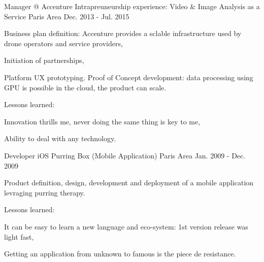 
\begin{cventries}

  \cventry
    {Manager @ Accenture} %
    {Intrapreuneurship experience: Video \& Image Analysis as a Service} %
    {Paris Area} %
    {Dec. 2013 - Jul. 2015} %
    {
      \begin{cvitems} %
        \item {Business plan definition: Accenture provides a sclable infrastructure used by drone operators and service providers,}
        \item {Initiation of partnerships,}
        \item {Platform UX prototyping. Proof of Concept development: data processing using GPU is possible in the cloud, the product can scale.}
        \item {Lessons learned:}
        \begin{cvsubitems}
          \item {Innovation thrills me, never doing the same thing is key to me,}
          \item {Ability to deal with any technology.}
        \end{cvsubitems}
      \end{cvitems}
    }

  \cventry
    {Developer iOS} %
    {Purring Box (Mobile Application)} %
    {Paris Area} %
    {Jan. 2009 - Dec. 2009} %
    {
      \begin{cvitems} %
        \item {Product definition, design, development and deployment of a mobile application levraging purring therapy.}
        \item {Lessons learned:}
        \begin{cvsubitems}
          \item {It can be easy to learn a new language and eco-system: 1st version release was light fast,}
          \item {Getting an application from unknown to famous is the piece de resistance.}
        \end{cvsubitems}
      \end{cvitems}
    }


\end{cventries}
